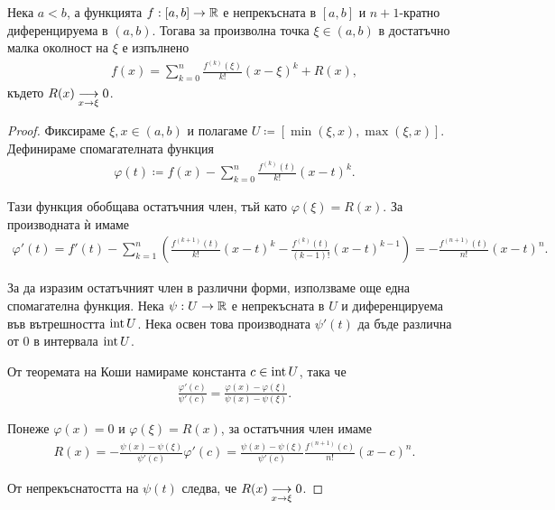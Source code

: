 \documentclass[numbers=endperiod, bibliography=totocnumbered]{scrartcl}
\begin{document}
\begin{theorem}[Тейлър]
  Нека \( a < b \), а функцията \( f: [a, b] \to \R \) е непрекъсната в \( [a, b] \) и \( n+1 \)-кратно диференцируема в \( (a, b) \). Тогава за произволна точка \( \xi \in (a, b) \) в достатъчно малка околност на \( \xi \) е изпълнено
  \begin{align*}
    f(x) = \sum_{k=0}^n \frac {f^{(k)}(\xi)} {k!} {(x-\xi)}^k + R(x),
  \end{align*}
  където \( R(x) \Conv[x \to \xi]{} 0 \).
\end{theorem}
\begin{proof}
  Фиксираме \( \xi, x \in (a, b) \) и полагаме \( U \coloneqq [\min(\xi, x), \max(\xi, x)] \). Дефинираме спомагателната функция
  \begin{align*}
    \varphi(t) \coloneqq f(x) - \sum_{k=0}^n \frac {f^{(k)}(t)} {k!} {(x-t)}^k.
  \end{align*}

  Тази функция обобщава остатъчния член, тъй като \( \varphi(\xi) = R(x) \). За производната ѝ имаме
  \begin{align*}
    \varphi'(t)
    =
    f'(t) -\sum_{k=1}^n \left( \frac {f^{(k+1)}(t)} {k!} {(x-t)}^k - \frac {f^{(k)}(t)} {(k-1)!} {(x-t)}^{k-1} \right)
    =
    - \frac {f^{(n+1)}(t)} {n!} {(x-t)}^n.
  \end{align*}

  За да изразим остатъчният член в различни форми, използваме още една спомагателна функция. Нека \( \psi: U \to \R \) е непрекъсната в \( U \) и диференцируема във вътрешността \( \Int U \). Нека освен това производната \( \psi'(t) \) да бъде различна от \( 0 \) в интервала \( \Int U \).

  От теоремата на Коши намираме константа \( c \in \Int U \), така че
  \begin{align*}
    \frac {\varphi'(c)} {\psi'(c)}
    =
    \frac {\varphi(x) - \varphi(\xi)} {\psi(x) - \psi(\xi)}.
  \end{align*}

  Понеже \( \varphi(x) = 0 \) и \( \varphi(\xi) = R(x) \), за остатъчния член имаме
  \begin{align*}
    R(x)
    =
    -\frac {\psi(x) - \psi(\xi)} {\psi'(c)} \varphi'(c)
    =
    \frac {\psi(x) - \psi(\xi)} {\psi'(c)} \frac {f^{(n+1)}(c)} {n!} {(x-c)}^n.
  \end{align*}

  От непрекъснатостта на \( \psi(t) \) следва, че \( R(x) \Conv[x \to \xi]{} 0 \).
\end{proof}
\end{document}
